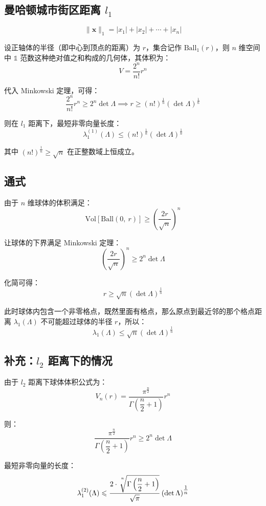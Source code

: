 \documentclass{article}
\begin{document}
\subsection{曼哈顿城市街区距离 $l_{1}$}
\[ \|\bm{x}\|_{1}=|x_1|+|x_2|+\cdots+|x_n| \]

设正轴体的半径（即中心到顶点的距离）为 $r$，集合记作 $\text{Ball}_{1}(r)$，则 $n$ 维空间中 $\mathds{1}$ 范数这种绝对值之和构成的几何体，其体积为：
\[ V=\dfrac{\displaystyle2^n}{n!}r^n \]

代入 Minkowski 定理，可得：
\[ \dfrac{\displaystyle2^n}{n!}r^n\geqslant2^n\det\Lambda\implies r\geqslant(n!)^{\tfrac{1}{n}}(\det\Lambda)^{\tfrac{1}{n}} \]

则在 $l_{1}$ 距离下，最短非零向量长度：
\[ \lambda_{1}^{(1)}(\Lambda)\leqslant(n!)^{\tfrac{1}{n}}(\det\Lambda)^{\tfrac{1}{n}} \]

其中 $(n!)^{\tfrac{1}{n}}\geqslant\sqrt{n}$ 在正整数域上恒成立。



\subsection{通式}
由于 $n$ 维球体的体积满足：
\[ \text{Vol}\left[\text{Ball}\left(0,\ r\right)\right]\geqslant\left(\dfrac{2r}{\displaystyle\sqrt{n}}\right)^n \]

让球体的下界满足 Minkowski 定理：
\[ \left(\dfrac{2r}{\displaystyle\sqrt{n}}\right)^n\geqslant2^n\det\Lambda \]

化简可得：
\[ r\geqslant\displaystyle\sqrt{n}(\det\Lambda)^{\tfrac{1}{n}} \]

此时球体内包含一个非零格点，既然里面有格点，那么原点到最近邻的那个格点距离 $\lambda_1(\Lambda)$ 不可能超过球体的半径 $r$，所以：
\[ \lambda_1(\Lambda)\leqslant\displaystyle\sqrt{n}(\det\Lambda)^{\tfrac{1}{n}} \]



\subsection{补充：$l_2$ 距离下的情况}
由于 $l_2$ 距离下球体体积公式为：
\[ V_n(r)=\dfrac{\pi^{\tfrac{n}{2}}}{\Gamma\left(\dfrac{n}{2}+1\right)}r^n \]

则：
\[ \dfrac{\pi^{\tfrac{n}{2}}}{\Gamma\left(\dfrac{n}{2}+1\right)}r^n\geqslant2^n\det\Lambda \]

最短非零向量的长度：
\[ \lambda_1^{(2)}(\Lambda)\leqslant\dfrac{\displaystyle2\cdot\sqrt[\leftroot{-1}\uproot{10}n]{\Gamma\left(\dfrac{n}{2}+1\right)}}{\displaystyle\sqrt{\pi}}\left(\det\Lambda\right)^{\tfrac{1}{n}} \]
\end{document}

